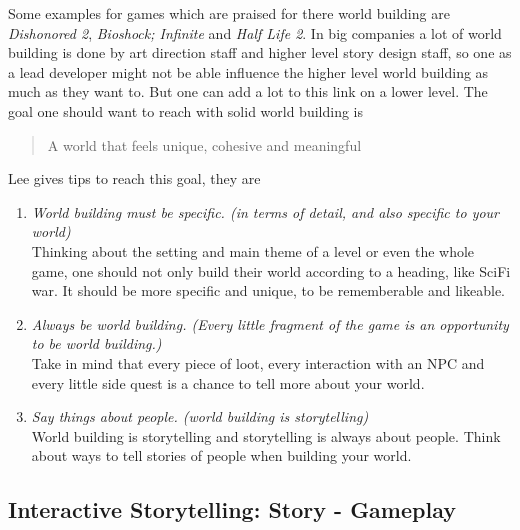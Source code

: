 \documentclass[a4paper]{article}
\begin{document}
Some examples for games which are praised for there world building are \textit{Dishonored 2}, \textit{Bioshock; Infinite} and \textit{Half Life 2}. In big companies a lot of world building is done by art direction staff and higher level story design staff, so one as a lead developer might not be able influence the higher level world building as much as they want to. But one can add a lot to this link on a lower level.
The goal one should want to reach with solid world building is
\begin{quote}A world that feels unique, cohesive and meaningful\end{quote}
Lee gives tips to reach this goal, they are
\begin{enumerate}
\item \textit{World building must be specific. (in terms of detail, and also specific to your world)}\\
Thinking about the setting and main theme of a level or even the whole game, one should not only build their world according to a heading, like SciFi war. It should be more specific and unique, to be rememberable and likeable.
\item \textit{Always be world building. (Every little fragment of the game is an opportunity to be world building.)}\\
Take in mind that every piece of loot, every interaction with an NPC and every little side quest is a chance to tell more about your world.
\item \textit{Say things about people. (world building is storytelling)}\\
World building is storytelling and storytelling is always about people. Think about ways to tell stories of people when building your world.
\end{enumerate}

\subsection{Interactive Storytelling: Story - Gameplay} \label{sssec:num3}
\end{document}

